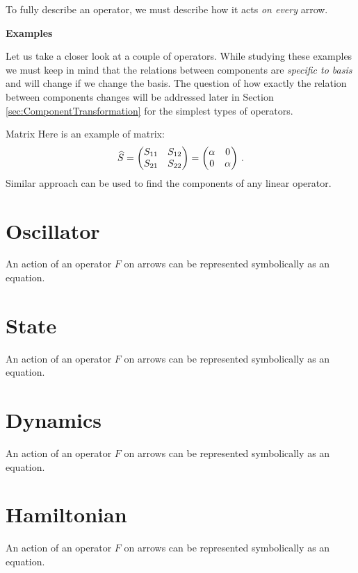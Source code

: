 To fully describe an operator, we must describe how it acts \emph{on
every} arrow. 

\begin{flushleft}
  {\bf Examples}
\end{flushleft}
Let us take a closer look at a couple of operators. While studying
these examples we must keep in mind that the relations between
components are \emph{specific to basis} and will change if we change the
basis. The question of how exactly the relation between components
changes will be addressed later in Section
\ref{sec:ComponentTransformation} for the simplest types of operators.


\begin{mybio}{Matrix}
Here is an example of matrix:
\[
\widehat{S} =
\begin{pmatrix}
  S_{11} & S_{12}\\
  S_{21} & S_{22}
\end{pmatrix} =
\begin{pmatrix}
  \alpha & 0\\
  0 & \alpha
\end{pmatrix}\,.
\]
Similar approach can be used to find the components of any linear operator.
\end{mybio}


\section{Oscillator}\label{sec:Oscillator}
An action of an operator $F$ on arrows can be represented symbolically
as an equation.

\section{State}\label{sec:State}
An action of an operator $F$ on arrows can be represented symbolically
as an equation.

\section{Dynamics}\label{sec:Dynamics}
An action of an operator $F$ on arrows can be represented symbolically
as an equation.

\section{Hamiltonian}\label{sec:Hamiltonian}
An action of an operator $F$ on arrows can be represented symbolically
as an equation.

